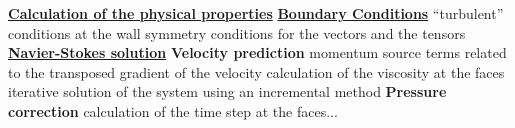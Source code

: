 \begin{table}[htp]
\underline{\textbf{Calculation of the physical properties}}\newline
\underline{\textbf{Boundary Conditions}}\newline
\hspace*{1cm} \newline
\hspace*{1,5cm} \hspace*{1cm} ``turbulent'' conditions at the
wall\newline
\hspace*{1,5cm} \hspace*{1cm} symmetry conditions for the
vectors and the tensors\newline
\underline{\textbf{Navier-Stokes solution}}\newline
\hspace*{1cm}\newline
\hspace*{1,5cm}\textbf{Velocity prediction}\newline
\hspace*{2,0cm} \newline
\hspace*{2,5cm} \hspace*{1cm} momentum source terms related to
the \newline
\hspace*{4,5cm} \hspace*{1cm} transposed gradient of the velocity\newline
\hspace*{2,5cm} \hspace*{1cm} calculation of the viscosity at
the faces\newline
\hspace*{2,5cm} \hspace*{1cm} iterative solution of the system
using an incremental method\newline
\hspace*{1,5cm}\textbf{Pressure correction}\newline
\hspace*{2,0cm} \newline
\hspace*{2,5cm} \hspace*{1cm}calculation of the time step at
the faces...\newline

\end{table}
